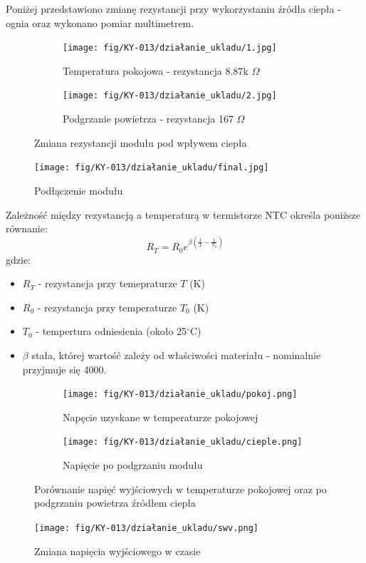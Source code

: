 \documentclass[11pt, a4paper]{article}
\begin{document}
Poniżej przedstawiono zmianę rezystancji przy wykorzystaniu źródła ciepła - ognia oraz wykonano pomiar multimetrem. 
\begin{figure}[h!]
\begin{subfigure}{.5\textwidth}
  \centering
  \texttt{[image: fig/KY-013/działanie\_ukladu/1.jpg]}
  \caption{Temperatura pokojowa - rezystancja 8.87k $\Omega$}
  \label{fig:sub1}
\end{subfigure}%
\begin{subfigure}{.5\textwidth}
  \centering
  \texttt{[image: fig/KY-013/działanie\_ukladu/2.jpg]}
  \caption{Podgrzanie powietrza - rezystancja 167 $\Omega$}
  \label{fig:sub2}
\end{subfigure}
\caption{Zmiana rezystancji modułu pod wpływem ciepła}
\label{fig:test}
\end{figure}

\vspace{0.5cm}
\begin{figure}[h!]
    \centering
    \texttt{[image: fig/KY-013/działanie\_ukladu/final.jpg]}
    \caption{Podłączenie modułu}
    \label{fig:my_label}
\end{figure}
\newpage 

Zależność między rezystancją a temperaturą w termistorze NTC określa poniższe równanie:
$$R_{T}=R_{0}e^{\beta(\frac{1}{T}-\frac{1}{T_0})}$$
gdzie:
\begin{itemize}
    \item $R_T$ - rezystancja przy temepraturze $T$ (K)
    \item $R_0$ - rezystancja przy temperaturze $T_0$ (K)
    \item $T_0$ - tempertura odniesienia (około 25$^\circ$C)
    \item $\beta$ stała, której wartość zależy od właściwości materiału - nominalnie przyjmuje się 4000.
\end{itemize}
\begin{figure}[h!]
\begin{subfigure}{.5\textwidth}
  \centering
  \texttt{[image: fig/KY-013/działanie\_ukladu/pokoj.png]}
  \caption{Napęcie uzyskane w temperaturze pokojowej}
  \label{fig:sub1}
\end{subfigure}%
\begin{subfigure}{.5\textwidth}
  \centering
\texttt{[image: fig/KY-013/działanie\_ukladu/cieple.png]}
\caption{Napięcie po podgrzaniu modułu}
  \label{fig:sub2}
\end{subfigure}
\caption{Porównanie napięć wyjściowych w temperaturze pokojowej oraz po podgrzaniu powietrza źródłem ciepła}
\label{fig:test}
\end{figure}
\begin{figure}[h!]
    \centering
    \texttt{[image: fig/KY-013/działanie\_ukladu/swv.png]}
    \caption{Zmiana napięcia wyjściowego w czasie}
    \label{fig:my_label}
\end{figure}
\end{document}
